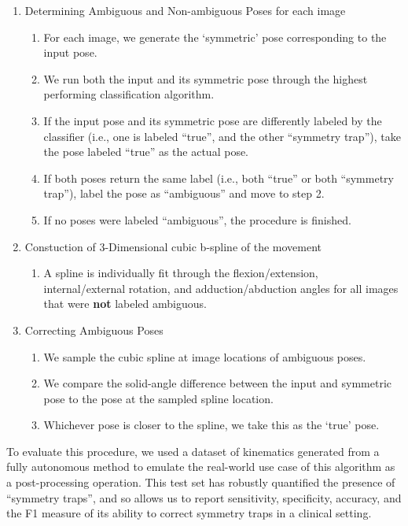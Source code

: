 \begin{enumerate}
	\item Determining Ambiguous and Non-ambiguous Poses for each image
	      \begin{enumerate}
		      \item For each image, we generate the `symmetric' pose corresponding to the input pose.
		      \item We run both the input and its symmetric pose through the highest performing classification algorithm.
		      \item If the input pose and its symmetric pose are differently labeled by the classifier (i.e., one is labeled ``true'', and the other ``symmetry trap''), take the pose labeled ``true'' as the actual pose.
		      \item If both poses return the same label (i.e., both ``true'' or both ``symmetry trap''), label the pose as “ambiguous” and move to step 2.
		      \item If no poses were labeled “ambiguous”, the procedure is finished.
	      \end{enumerate}
	\item Constuction of 3-Dimensional cubic b-spline of the movement
	      \begin{enumerate}
		      \item A spline is individually fit through the flexion/extension, internal/external rotation, and adduction/abduction angles for all images that were {\bf not} labeled ambiguous.
	      \end{enumerate}
	\item Correcting Ambiguous Poses
	      \begin{enumerate}
		      \item We sample the cubic spline at image locations of ambiguous poses.
		      \item We compare the solid-angle difference between the input and symmetric pose to the pose at the sampled spline location.
		      \item Whichever pose is closer to the spline, we take this as the `true' pose.
	      \end{enumerate}
\end{enumerate}

To evaluate this procedure, we used a dataset of kinematics generated from a fully autonomous method \cite{jensenJointTrackMachine2023} to emulate the real-world use case of this algorithm as a post-processing operation.
This test set has robustly quantified the presence of “symmetry traps”, and so allows us to report sensitivity, specificity, accuracy, and the F1 measure of its ability to correct symmetry traps in a clinical setting.


